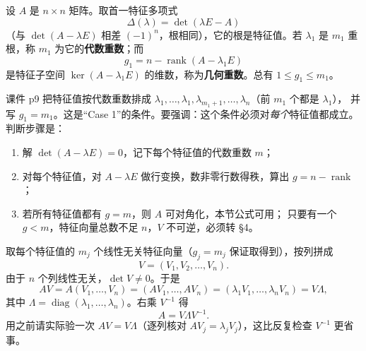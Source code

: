 \documentclass[11pt]{ctexart}
\begin{document}
\flowerrule

\clearpage
{}


设 $A$ 是 $n\times n$ 矩阵。取首一特征多项式
\[
\Delta(\lambda)=\det(\lambda E-A)
\]
（与 $\det(A-\lambda E)$ 相差 $(-1)^n$，根相同），它的根是特征值。若 $\lambda_1$ 是 $m_1$ 重根，称 $m_1$ 为它的\textbf{代数重数}；而
\[
g_1=n-\operatorname{rank}(A-\lambda_1E)
\]
是特征子空间 $\ker(A-\lambda_1E)$ 的维数，称为\textbf{几何重数}。总有 $1\le g_1\le m_1$。

课件 p9 把特征值按代数重数排成
$\lambda_1,\dots,\lambda_1,\lambda_{m_1+1},\dots,\lambda_n$（前 $m_1$ 个都是 $\lambda_1$），
并写 $g_1=m_1$。这是“Case 1”的条件。要强调：这个条件必须对\emph{每个}特征值都成立。
判断步骤是：
\begin{enumerate}
  \item 解 $\det(A-\lambda E)=0$，记下每个特征值的代数重数 $m$；
  \item 对每个特征值，对 $A-\lambda E$ 做行变换，数非零行数得秩，算出 $g=n-\operatorname{rank}$；
  \item 若所有特征值都有 $g=m$，则 $A$ 可对角化，本节公式可用；
        只要有一个 $g<m$，特征向量总数不足 $n$，$V$ 不可逆，必须转 §4。
\end{enumerate}


取每个特征值的 $m_j$ 个线性无关特征向量（$g_j=m_j$ 保证取得到），按列拼成
\[
V=(V_1,V_2,\dots,V_n).
\]
由于 $n$ 个列线性无关，$\det V\ne0$。于是
\[
AV=A(V_1,\dots,V_n)=(AV_1,\dots,AV_n)=(\lambda_1V_1,\dots,\lambda_nV_n)=V\Lambda,
\]
其中 $\Lambda=\operatorname{diag}(\lambda_1,\dots,\lambda_n)$。右乘 $V^{-1}$ 得
\begin{equation}\label{eq:diag}
A=V\Lambda V^{-1}.
\end{equation}
用之前请实际验一次 $AV=V\Lambda$（逐列核对 $AV_j=\lambda_jV_j$），这比反复检查 $V^{-1}$ 更省事。

\end{document}
